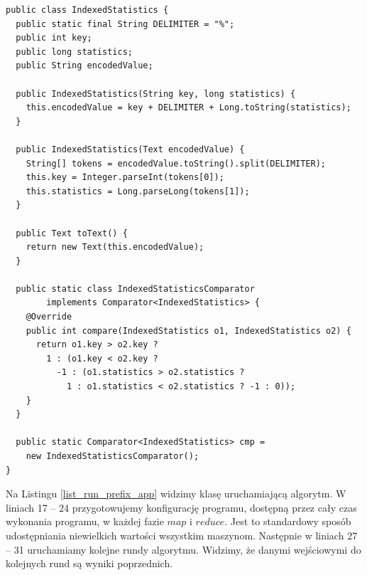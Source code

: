 \documentclass[magisterska]{pracamgr}
\begin{document}
\begin{lstlisting}[language=SmallJava,firstnumber=1,label=list_index_stats,caption=Klasa indeksowanych statystyk]
public class IndexedStatistics {
  public static final String DELIMITER = "%";
  public int key;
  public long statistics;
  public String encodedValue;

  public IndexedStatistics(String key, long statistics) {
    this.encodedValue = key + DELIMITER + Long.toString(statistics);
  }

  public IndexedStatistics(Text encodedValue) {
    String[] tokens = encodedValue.toString().split(DELIMITER);
    this.key = Integer.parseInt(tokens[0]);
    this.statistics = Long.parseLong(tokens[1]);
  }

  public Text toText() {
    return new Text(this.encodedValue);
  }

  public static class IndexedStatisticsComparator
        implements Comparator<IndexedStatistics> {
    @Override
    public int compare(IndexedStatistics o1, IndexedStatistics o2) {
      return o1.key > o2.key ?
        1 : (o1.key < o2.key ?
          -1 : (o1.statistics > o2.statistics ?
            1 : o1.statistics < o2.statistics ? -1 : 0));
    }
  }

  public static Comparator<IndexedStatistics> cmp =
    new IndexedStatisticsComparator();
}
\end{lstlisting}

\newpage
Na Listingu \ref{list_run_prefix_app} widzimy klasę uruchamiającą algorytm. W liniach 17 -- 24 przygotowujemy konfigurację programu, dostępną przez cały czas wykonania programu, w każdej fazie \(map\) i \(reduce\). Jest to standardowy sposób udostępniania niewielkich wartości wszystkim maszynom. Następnie w liniach 27 -- 31 uruchamiamy kolejne rundy algorytmu. Widzimy, że danymi wejściowymi do kolejnych rund są wyniki poprzednich.
\end{document}
